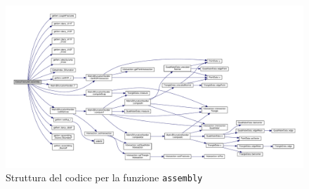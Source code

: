 \begin{figure}[h!]
\centering
\includegraphics[scale=.4, angle=90]{img/subcap3_4/assembly.pdf}
\caption{Struttura del codice per la funzione \texttt{assembly}}\label{Inclusione classi DarcyFractured}
\end{figure}


